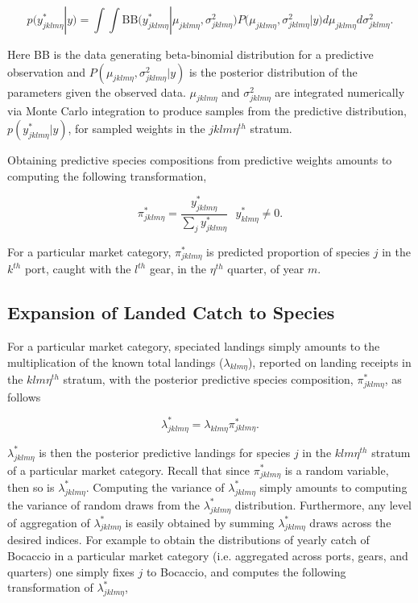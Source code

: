 \documentclass[12pt]{article}
\begin{document}
\[p(y^*_{jklm\eta}|y) = \int\!\!\!\!\int\! \text{BB}\Big( y^*_{jklm\eta}|\mu_{jklm\eta}, \sigma^2_{jklm\eta} \Big) P\Big(\mu_{jklm\eta}, \sigma^2_{jklm\eta} | y\Big) d\mu_{jklm\eta} d\sigma^2_{jklm\eta}.\]

Here BB is the data generating beta-binomial distribution for a
predictive observation and \(P(\mu_{jklm\eta}, \sigma^2_{jklm\eta}|y)\)
is the posterior distribution of the parameters given the observed data.
\(\mu_{jklm\eta}\) and \(\sigma^2_{jklm\eta}\) are integrated numerically via 
Monte Carlo integration to produce samples from the predictive distribution, 
\(p(y^*_{jklm\eta}|y)\), for sampled weights in the \(jklm\eta^{th}\) stratum.

Obtaining predictive species compositions from predictive weights
amounts to computing the following transformation,

\[\pi^*_{jklm\eta} = \frac{y^*_{jklm\eta}}{\sum_j y^*_{jklm\eta}} ~~~ y^*_{klm\eta}\neq 0.\]

For a particular market category, \(\pi^*_{jklm\eta}\) is predicted
proportion of species \(j\) in the \(k^{th}\) port, caught with the
\(l^{th}\) gear, in the \(\eta^{th}\) quarter, of year \(m\).

\subsection{Expansion of Landed Catch to Species}\label{expansion}

For a particular market category, speciated landings simply amounts to
the multiplication of the known total landings (\(\lambda_{klm\eta}\)),
reported on landing receipts in the \(klm\eta^{th}\) stratum, with the
posterior predictive species composition, \(\pi^*_{jklm\eta}\), as follows

\[\lambda^*_{jklm\eta} = \lambda_{klm\eta}\pi^*_{jklm\eta}.\]

\(\lambda^*_{jklm\eta}\) is then the posterior predictive landings for
species \(j\) in the \(klm\eta^{th}\) stratum of a particular market
category. Recall that since \(\pi^*_{jklm\eta}\) is a random variable,
then so is \(\lambda^*_{jklm\eta}\). Computing the variance of
\(\lambda^*_{jklm\eta}\) simply amounts to computing the variance of
random draws from the \(\lambda^*_{jklm\eta}\) distribution.
Furthermore, any level of aggregation of \(\lambda^*_{jklm\eta}\) is
easily obtained by summing \(\lambda^*_{jklm\eta}\) draws across the
desired indices. For example to obtain the distributions of yearly catch
of Bocaccio in a particular market category (i.e. aggregated across ports, 
gears, and quarters) one simply fixes $j$ to Bocaccio, and computes the 
following transformation of \(\lambda^*_{jklm\eta}\),
\end{document}
